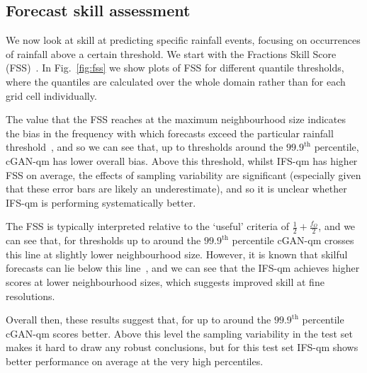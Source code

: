 \documentclass{article}
\begin{document}
\subsection{Forecast skill assessment}
\label{sec:fcst_skill}

We now look at skill at predicting specific rainfall events, focusing on occurrences of rainfall above a certain threshold. We start with the Fractions Skill Score (FSS)~\citep{roberts_assessing_2008, roberts_scale-selective_2008}. In Fig.~\ref{fig:fss} we show plots of FSS for different quantile thresholds, where the quantiles are calculated over the whole domain rather than for each grid cell individually.

The value that the FSS reaches at the maximum neighbourhood size indicates the bias in the frequency with which forecasts exceed the particular rainfall threshold~\citep{roberts_assessing_2008, roberts_scale-selective_2008}, and so we can see that, up to thresholds around the $99.9^{\text{th}}$ percentile, cGAN-qm has lower overall bias. Above this threshold, whilst IFS-qm has higher FSS on average, the effects of sampling variability are significant (especially given that these error bars are likely an underestimate), and so it is unclear whether IFS-qm is performing systematically better. 

The FSS is typically interpreted relative to the `useful' criteria of $\frac{1}{2} + \frac{f_O}{2}$, and we can see that, for thresholds up to around the $99.9^{\text{th}}$ percentile cGAN-qm crosses this line at slightly lower neighbourhood size. However, it is known that skilful forecasts can lie below this line~\citep{nachamkin_applying_2015, mittermaier_long-term_2013}, and we can see that the IFS-qm achieves higher scores at lower neighbourhood sizes, which suggests improved skill at fine resolutions. 

Overall then, these results suggest that, for up to around the $99.9^{\text{th}}$ percentile cGAN-qm scores better. Above this level the sampling variability in the test set makes it hard to draw any robust conclusions, but for this test set IFS-qm shows better performance on average at the very high percentiles.
\end{document}
